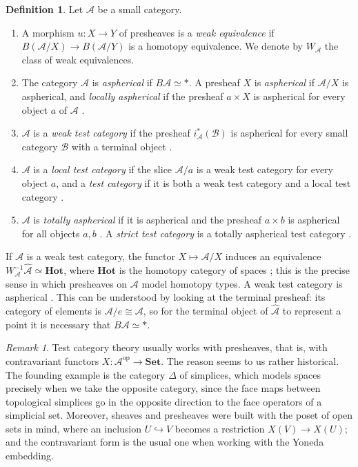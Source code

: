 \documentclass[11pt]{amsart}
\theoremstyle{definition}
\newtheorem{definition}[teo]{Definition}
\theoremstyle{remark}
\newtheorem{remark}[teo]{Remark}
\numberwithin{figure}{section}%
\newcommand{\Set}{\mathbf{Set}}
\newcommand{\Hot}{\mathbf{Hot}}
\newcommand{\op}{\mathrm{op}}
\newcommand{\A}{\mathcal{A}}
\begin{document}
\begin{definition}
\label{def:test}
Let $\A$ be a small category.
\begin{enumerate}[leftmargin=*]
\item A morphism $u\colon X\to Y$ of presheaves is a \emph{weak equivalence} if $B(\A/X)\to B(\A/Y)$ is a homotopy equivalence. We denote by $W_\A$ the class of weak equivalences.
\item The category $\A$ is \emph{aspherical} if $B\A\simeq*$. A presheaf $X$ is \emph{aspherical} if $\A/X$ is aspherical, and \emph{locally aspherical} if the presheaf $a\times X$ is aspherical for every object $a$ of $\A$ \cite[1.2.6]{Malt}.
\item $\A$ is a \emph{weak test category} if the presheaf $i_\A^*(\mathcal B)$ is aspherical for every small category $\mathcal B$ with a terminal object \cite[Prop.~1.3.9]{Malt}.
\item $\A$ is a \emph{local test category} if the slice $\A/a$ is a weak test category for every object $a$, and a \emph{test category} if it is both a weak test category and a local test category \cite[Def.~1.5.2]{Malt}.
\item $\A$ is \emph{totally aspherical} if it is aspherical and the presheaf $a\times b$ is aspherical for all objects $a,b$ \cite[Def.~1.6.2]{Malt}. A \emph{strict test category} is a totally aspherical test category \cite[Def.~1.6.7]{Malt}.
\end{enumerate}
\end{definition}

If $\A$ is a weak test category, the functor $X\mapsto\A/X$ induces an equivalence $W_\A^{-1}\widehat{\A}\simeq\Hot$, where $\Hot$ is the homotopy category of spaces \cite[\S1.3]{Malt}; this is the precise sense in which presheaves on $\A$ model homotopy types. A weak test category is aspherical \cite[Prop.~1.3.9]{Malt}. This can be understood by looking at the terminal presheaf: its category of elements is $\A/e\cong\A$, so for the terminal object of $\widehat{\A}$ to represent a point it is necessary that $B\A\simeq*$.

\begin{remark}
Test category theory usually works with presheaves, that is, with contravariant functors $X\colon\A^{\op}\to\Set$. The reason seems to us rather historical. The founding example is the category $\Delta$ of simplices, which models spaces precisely when we take the opposite category, since the face maps between topological simplices go in the opposite direction to the face operators of a simplicial set. Moreover, sheaves and presheaves were built with the poset of open sets in mind, where an inclusion $U\hookrightarrow V$ becomes a restriction $X(V)\to X(U)$; and the contravariant form is the usual one when working with the Yoneda embedding.
\end{remark}
\end{document}
